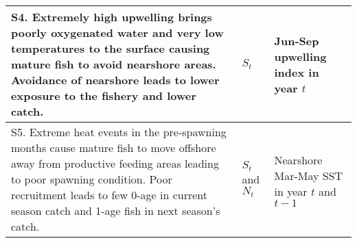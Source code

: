 \begin{table}[t]
\begin{tabular}{>{\raggedright\arraybackslash}p{8.5cm}|>{\raggedright\arraybackslash}p{1cm}|>{\raggedright\arraybackslash}p{3cm}}
\hline
S4.  Extremely high upwelling brings poorly oxygenated water and very low temperatures to the surface causing mature fish to avoid nearshore areas. Avoidance of nearshore leads to lower exposure to the fishery and lower catch. & $S_t$ & Jun-Sep upwelling index in year $t$\\
\hline
S5.  Extreme heat events in the pre-spawning months cause mature fish to move offshore away from productive feeding areas leading to poor spawning condition. Poor recruitment leads to few 0-age in current season catch and 1-age fish in next season's catch. & $S_t$ and $N_t$ & Nearshore Mar-May SST in year $t$ and $t-1$\\
\hline
\end{tabular}
\end{table}

\clearpage

